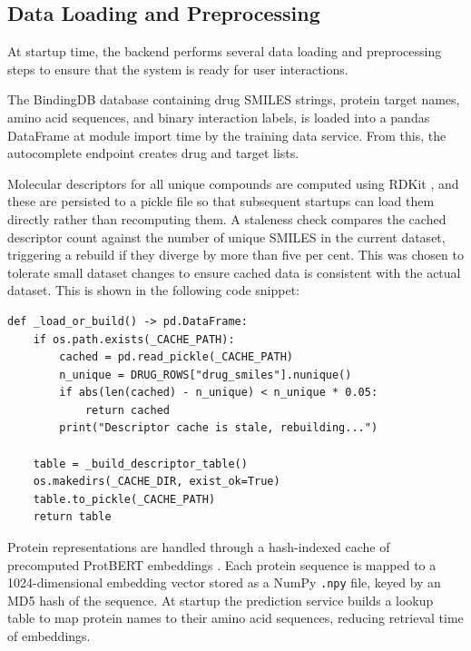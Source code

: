 \subsection{Data Loading and Preprocessing}
\label{subsec:data_loading}
At startup time, the backend performs several data loading and preprocessing steps to ensure that the system is ready for user interactions.

The BindingDB database containing drug SMILES strings, protein target names, amino acid sequences, and binary interaction labels, is loaded into a pandas DataFrame at module import time by the training data service.
From this, the autocomplete endpoint creates drug and target lists.

Molecular descriptors for all unique compounds are computed using RDKit \citep{rdkit_doc}, and these are persisted to a pickle file so that subsequent startups can load them directly rather than recomputing them.
A staleness check compares the cached descriptor count against the number of unique SMILES in the current dataset, triggering a rebuild if they diverge by more than five per cent.
This was chosen to tolerate small dataset changes to ensure cached data is consistent with the actual dataset.
This is shown in the following code snippet:

\begin{lstlisting}[caption={Descriptor cache loading with staleness check.}, label={lst:cache_load}]
def _load_or_build() -> pd.DataFrame:
    if os.path.exists(_CACHE_PATH):
        cached = pd.read_pickle(_CACHE_PATH)
        n_unique = DRUG_ROWS["drug_smiles"].nunique()
        if abs(len(cached) - n_unique) < n_unique * 0.05:
            return cached
        print("Descriptor cache is stale, rebuilding...")

    table = _build_descriptor_table()
    os.makedirs(_CACHE_DIR, exist_ok=True)
    table.to_pickle(_CACHE_PATH)
    return table
\end{lstlisting}

Protein representations are handled through a hash-indexed cache of precomputed ProtBERT embeddings \citep{Elnaggar2020.07.12.199554}.
Each protein sequence is mapped to a 1024-dimensional embedding vector stored as a NumPy \texttt{.npy} file, keyed by an MD5 hash of the sequence.
At startup the prediction service builds a lookup table to map protein names to their amino acid sequences, reducing retrieval time of embeddings.

